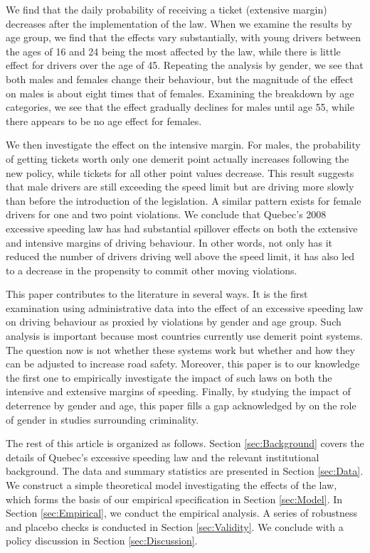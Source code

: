 We find that the daily probability of receiving a ticket (extensive margin) 
decreases after the implementation of the law. 
When we examine the results by age group, we find that the effects vary substantially, 
with young drivers between the ages of 16 and 24 being the most affected by the law, 
while there is little effect for drivers over the age of 45. 
Repeating the analysis by gender, we see that both males and females change their behaviour, 
but the magnitude of the effect on males is about eight times that of females. 
Examining the breakdown by age categories, we see that the effect gradually declines 
for males until age 55, while there appears to be no age effect for females. 

We then investigate the effect on the intensive margin. 
For males, the probability of getting tickets worth only one demerit point 
actually increases following the new policy, while tickets for all other point values decrease. 
This result suggests that male drivers are still exceeding the speed limit 
but are driving more slowly than before the introduction of the legislation. 
A similar pattern exists for female drivers for one and two point violations. 
We conclude that Quebec’s 2008 excessive speeding law has had substantial spillover effects 
on both the extensive and intensive margins of driving behaviour. 
In other words, not only has it reduced the number of drivers driving well above the speed limit, 
it has also led to a decrease in the propensity to commit other moving violations.

This paper contributes to the literature in several ways. 
It is the first examination using administrative data into the effect of 
an excessive speeding law on driving behaviour 
as proxied by violations by gender and age group. 
Such analysis is important because most countries currently use demerit point systems. 
The question now is not whether these systems work 
but whether and how they can be adjusted to increase road safety. 
Moreover, this paper is to our knowledge the first one to empirically investigate 
the impact of such laws on both the intensive and extensive margins of speeding. 
Finally, by studying the impact of deterrence by gender and age, 
this paper fills a gap acknowledged by 
\citet{freeman1999}
on the role of gender in studies surrounding criminality.


The rest of this article is organized as follows. 
Section \ref{sec:Background} covers the details of Quebec’s excessive speeding law 
and the relevant institutional background. 
The data and summary statistics are presented in Section \ref{sec:Data}. 
We construct a simple theoretical model investigating the effects of the law,
which forms the basis of our empirical specification in Section \ref{sec:Model}. 
In Section \ref{sec:Empirical}, we conduct the empirical analysis. 
A series of robustness and placebo checks is conducted in Section \ref{sec:Validity}. 
We conclude with a policy discussion in Section \ref{sec:Discussion}.

